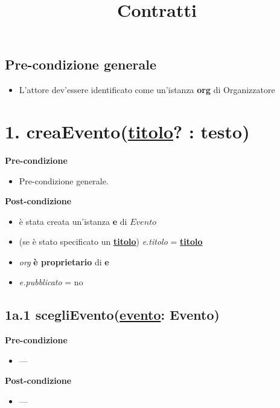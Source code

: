 \documentclass[12pt]{extarticle}
\begin{document}
\title{Contratti}
\date{}
\maketitle

\subsection*{Pre-condizione generale}

\begin{itemize}
  \item L'attore dev'essere identificato come un'istanza \textbf{org} di Organizzatore
\end{itemize}

\section*{1. creaEvento(\underline{titolo}? : testo)}

\textbf{Pre-condizione}
\begin{itemize}
  \item Pre-condizione generale.
\end{itemize}
\textbf{Post-condizione}
\begin{itemize}
  \item è stata creata un'istanza \textbf{e} di $Evento$
  \item (se è stato specificato un \textbf{\underline{titolo}}) \textit{e.titolo} = \textbf{\underline{titolo}}
  \item \textit{org} \textbf{è proprietario} di \textbf{e}
  \item \textit{e.pubblicato} = no
\end{itemize}

\subsection*{1a.1 scegliEvento(\underline{evento}: Evento)}
\textbf{Pre-condizione}
\begin{itemize}
  \item ---
\end{itemize}
\textbf{Post-condizione}
\begin{itemize}
  \item ---
\end{itemize}
\end{document}
